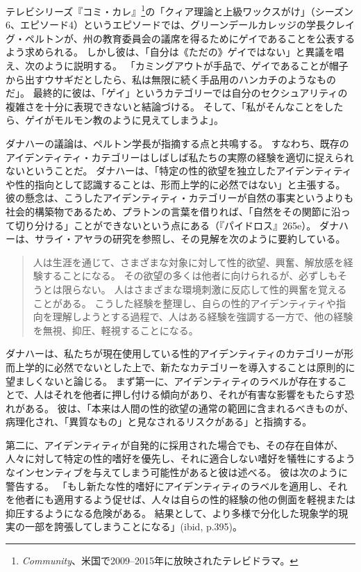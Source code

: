 \documentclass[paper=a4,book,openany]{jlreq}
\begin{document}
テレビシリーズ『コミ・カレ』\footnote{\emph{Community}、米国で2009--2015年に放映されたテレビドラマ。}の「クィア理論と上級ワックスがけ」（シーズン6、エピソード4）というエピソードでは、グリーンデールカレッジの学長クレイグ・ペルトンが、州の教育委員会の議席を得るためにゲイであることを公表するよう求められる。
しかし彼は、「自分は《ただの》ゲイではない」と異議を唱え、次のように説明する。
「カミングアウトが手品で、ゲイであることが帽子から出すウサギだとしたら、私は無限に続く手品用のハンカチのようなものだ」。
最終的に彼は、「ゲイ」というカテゴリーでは自分のセクシュアリティの複雑さを十分に表現できないと結論づける。
そして、「私がそんなことをしたら、ゲイがモルモン教のように見えてしまうよ」。

ダナハーの議論は、ペルトン学長が指摘する点と共鳴する。
すなわち、既存のアイデンティティ・カテゴリーはしばしば私たちの実際の経験を適切に捉えられないということだ。
ダナハーは、「特定の性的欲望を独立したアイデンティティや性的指向として認識することは、形而上学的に必然ではない」と主張する\citep[p.393]{danaher20:_sexual}。
彼の懸念は、こうしたアイデンティティ・カテゴリーが自然の事実というよりも社会的構築物であるため、プラトンの言葉を借りれば、「自然をその関節に沿って切り分ける」ことができないという点にある（『パイドロス』265e）。
ダナハーは、サライ・アヤラの研究\citep{ayala18:_sexual_orien_choic}を参照し、その見解を次のように要約している。

\begin{quote}
人は生涯を通じて、さまざまな対象に対して性的欲望、興奮、解放感を経験することになる。
その欲望の多くは他者に向けられるが、必ずしもそうとは限らない。
人はさまざまな環境刺激に反応して性的興奮を覚えることがある。
こうした経験を整理し、自らの性的アイデンティティや指向を理解しようとする過程で、人はある経験を強調する一方で、他の経験を無視、抑圧、軽視することになる。
\citep{danaher20:_sexual}
\end{quote}

ダナハーは、私たちが現在使用している性的アイデンティティのカテゴリーが形而上学的に必然でないとした上で、新たなカテゴリーを導入することは原則的に望ましくないと論じる。
まず第一に、アイデンティティのラベルが存在することで、人はそれを他者に押し付ける傾向があり、それが有害な影響をもたらす恐れがある。
彼は、「本来は人間の性的欲望の通常の範囲に含まれるべきものが、病理化され、「異質なもの」と見なされるリスクがある」と指摘する\citep[p.393]{danaher20:_sexual}。

第二に、アイデンティティが自発的に採用された場合でも、その存在自体が、人々に対して特定の性的嗜好を優先し、それに適合しない嗜好を犠牲にするようなインセンティブを与えてしまう可能性があると彼は述べる。
彼は次のように警告する。
「もし新たな性的嗜好にアイデンティティのラベルを適用し、それを他者にも適用するよう促せば、人々は自らの性的経験の他の側面を軽視または抑圧するようになる危険がある。
結果として、より多様で分化した現象学的現実の一部を誇張してしまうことになる」(ibid, p.395)。
\end{document}
